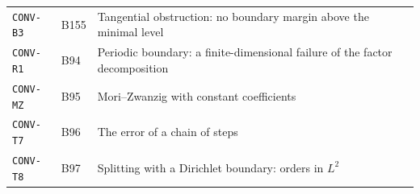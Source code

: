 \documentclass[11pt,a4paper,oneside]{report}
\begin{document}
\begin{center}
\begin{longtable}{@{}L{3.6cm}L{1.2cm}L{8.0cm}L{1.2cm}@{}}
\texttt{CONV-B3} & B155 & Tangential obstruction: no boundary margin above the minimal level & \pageref{dim:CONV-B3}\\
\texttt{CONV-R1} & B94 & Periodic boundary: a finite-dimensional failure of the factor decomposition & \pageref{dim:CONV-R1}\\
\texttt{CONV-MZ} & B95 & Mori--Zwanzig with constant coefficients & \pageref{dim:CONV-MZ}\\
\texttt{CONV-T7} & B96 & The error of a chain of steps & \pageref{dim:CONV-T7}\\
\texttt{CONV-T8} & B97 & Splitting with a Dirichlet boundary: orders in $L^2$ & \pageref{dim:CONV-T8}\\
\bottomrule
\end{longtable}
\end{center}
\end{document}
